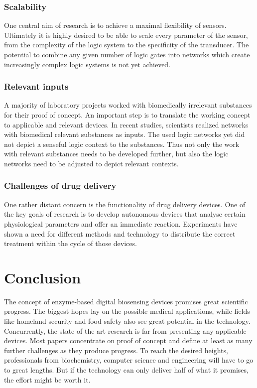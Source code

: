 \documentclass[runningheads]{llncs}
\begin{document}
\subsubsection{Scalability}	One central aim of research is to achieve a maximal flexibility of sensors. Ultimately it is highly desired to be able to scale every parameter of the sensor, from the complexity of the logic system to the specificity of the transducer. The potential to combine any given number of logic gates into networks which create increasingly complex logic systems is not yet achieved. 

\subsubsection{Relevant inputs}	A majority of laboratory projects worked with biomedically irrelevant substances for their proof of concept. An important step is to translate the working concept to applicable and relevant devices. In recent studies, scientists realized networks with biomedical relevant substances as inputs. The used logic networks yet did not depict a senseful logic context to the substances. Thus not only the work with relevant substances needs to be developed further, but also the logic networks need to be adjusted to depict relevant contexts. 

\subsubsection{Challenges of drug delivery}	One rather distant concern is the functionality of drug delivery devices. One of the key goals of research is to develop autonomous devices that analyse certain physiological parameters and offer an immediate reaction. Experiments have shown a need for different methods and technology to distribute the correct treatment within the cycle of those devices. \cite{original}


\section{Conclusion}

The concept of enzyme-based digital biosensing devices promises great scientific progress. The biggest hopes lay on the possible medical applications, while fields like homeland security and food safety also see great potential in the technology. Concurrently, the state of the art research is far from presenting any applicable devices. Most papers concentrate on proof of concept and define at least as many further challenges as they produce progress. To reach the desired heights, professionals from biochemistry, computer science and engineering will have to go to great lengths. But if the technology can only deliver half of what it promises, the effort might be worth it.
\end{document}
